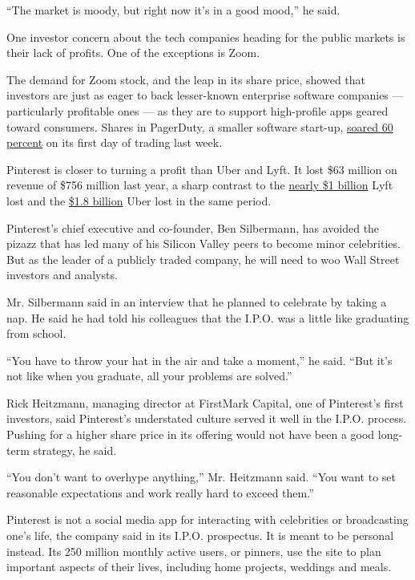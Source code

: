 ``The market is moody, but right now it's in a good mood,'' he said.

One investor concern about the tech companies heading for the public
markets is their lack of profits. One of the exceptions is Zoom.

The demand for Zoom stock, and the leap in its share price, showed that
investors are just as eager to back lesser-known enterprise software
companies --- particularly profitable ones --- as they are to support
high-profile apps geared toward consumers. Shares in PagerDuty, a
smaller software start-up,
\href{https://www.nytimes3xbfgragh.onion/2019/04/15/technology/ipo-tech-companies-horde.html}{soared
60 percent} on its first day of trading last week.

Pinterest is closer to turning a profit than Uber and Lyft. It lost \$63
million on revenue of \$756 million last year, a sharp contrast to the
\href{https://www.nytimes3xbfgragh.onion/2019/03/01/technology/lyft-ipo-filing.html}{nearly
\$1 billion} Lyft lost and the
\href{https://www.nytimes3xbfgragh.onion/2019/04/11/technology/uber-ipo-filing.html}{\$1.8
billion} Uber lost in the same period.

Pinterest's chief executive and co-founder, Ben Silbermann, has avoided
the pizazz that has led many of his Silicon Valley peers to become minor
celebrities. But as the leader of a publicly traded company, he will
need to woo Wall Street investors and analysts.

Mr. Silbermann said in an interview that he planned to celebrate by
taking a nap. He said he had told his colleagues that the I.P.O. was a
little like graduating from school.

``You have to throw your hat in the air and take a moment,'' he said.
``But it's not like when you graduate, all your problems are solved.''

Rick Heitzmann, managing director at FirstMark Capital, one of
Pinterest's first investors, said Pinterest's understated culture served
it well in the I.P.O. process. Pushing for a higher share price in its
offering would not have been a good long-term strategy, he said.

``You don't want to overhype anything,'' Mr. Heitzmann said. ``You want
to set reasonable expectations and work really hard to exceed them.''

Pinterest is not a social media app for interacting with celebrities or
broadcasting one's life, the company said in its I.P.O. prospectus. It
is meant to be personal instead. Its 250 million monthly active users,
or pinners, use the site to plan important aspects of their lives,
including home projects, weddings and meals.

